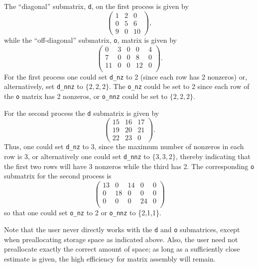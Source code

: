 The ``diagonal'' submatrix, \lstinline{d}, on the first process is given by
{\small
\[
\left( \begin{array}{ccc}
1  & 2  & 0  \\
0  & 5  & 6  \\
9  & 0  & 10
\end{array} \right),
\]
}
while the ``off-diagonal'' submatrix, \lstinline{o}, matrix is given by
{\small
\[
\left( \begin{array}{ccccc}
 0  & 3  & 0   & 0  & 4  \\
 7  & 0  & 0   & 8  & 0  \\
 11 & 0  & 0   & 12 & 0  \\
\end{array} \right).
\]
}
For the first process one could set \lstinline{d_nz} to 2 (since each
row has 2 nonzeros) or, alternatively, set \lstinline{d_nnz} to $\{2,2,2\}.$
The \lstinline{o_nz} could be set to 2 since each row of the \lstinline{o} matrix
has 2 nonzeros, or \lstinline{o_nnz} could be set to $\{2,2,2\}$.

For the second process the \lstinline{d} submatrix is given by
{\small
\[
\left( \begin{array}{cccccccccc}
 15 & 16 & 17 \\
 19 & 20 & 21 \\
 22 & 23 & 0
\end{array} \right) .
\]
}
Thus, one could set \lstinline{d_nz} to 3, since the maximum number of
nonzeros in each row is 3, or alternatively one could set \lstinline{d_nnz} to
$\{3,3,2\}$, thereby indicating that the first two rows will have 3
nonzeros while the third has 2. The corresponding \lstinline{o} submatrix for the
second process is
{\small
\[
\left( \begin{array}{cccccccccc}
13 & 0  & 14 &  0  & 0  \\
0  & 18 & 0  &  0  & 0 \\
0  & 0  & 0  &  24 & 0 \\
\end{array} \right)
\]
}
so that one could set \lstinline{o_nz} to 2 or \lstinline{o_nnz} to \{2,1,1\}.

Note that the user never directly works with the \lstinline{d} and \lstinline{o}
submatrices, except when preallocating storage space as indicated above.
Also, the user need not preallocate exactly the correct amount of
space; as long as a sufficiently close estimate is given, the high
efficiency for matrix assembly will remain.

